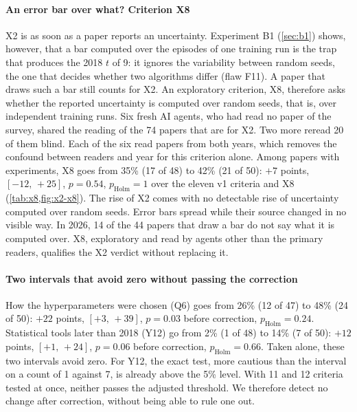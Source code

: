 \paragraph{An error bar over what? Criterion X8}
X2 is  as soon as a paper reports an uncertainty. Experiment B1 (\cref{sec:b1}) shows, however, that
a bar computed over the episodes of one training run is the trap that produces the 2018 $t$ of 9: it ignores
the variability between random seeds, the one that decides whether two algorithms differ (flaw F11). A paper
that draws such a bar still counts  for X2. An exploratory criterion, X8, therefore asks
whether the reported uncertainty is computed over random seeds, that is, over independent training
runs. Six fresh AI agents, who had read no paper of the survey, shared the reading
of the 74 papers that are  for X2. Two more reread 20 of them blind. Each of the six read papers from
both years, which removes the confound
between readers and year for this criterion alone. Among papers with experiments, X8 goes from 35\% (17 of 48)
to 42\% (21 of 50): $+7$ points, $[-12,\,+25]$, $p = 0.54$, $p_{\text{Holm}} = 1$ over the eleven v1
criteria and X8 (\cref{tab:x8,fig:x2-x8}). The rise of X2 comes with
no detectable rise of uncertainty computed over random seeds. Error bars spread while their source changed in
no visible way. In 2026, 14 of the 44 papers that draw a bar do not say what it is computed over. X8,
exploratory and read by agents other than the primary readers, qualifies the X2 verdict without
replacing it.



\paragraph{Two intervals that avoid zero without passing the correction}
How the hyperparameters were chosen (Q6) goes from 26\% (12 of 47) to 48\% (24 of 50): $+22$ points,
$[+3,\,+39]$, $p = 0.03$ before correction, $p_{\text{Holm}} = 0.24$. Statistical tools later than 2018
(Y12) go from 2\% (1 of 48) to 14\% (7 of 50): $+12$ points, $[+1,\,+24]$, $p = 0.06$ before
correction, $p_{\text{Holm}} = 0.66$. Taken alone, these two intervals avoid zero. For Y12, the exact
test, more cautious than the interval on a count of 1 against 7, is already above the 5\% level. With
11 and 12 criteria tested at once, neither passes the adjusted threshold. We therefore detect no change after correction, without being able to rule
one out.

